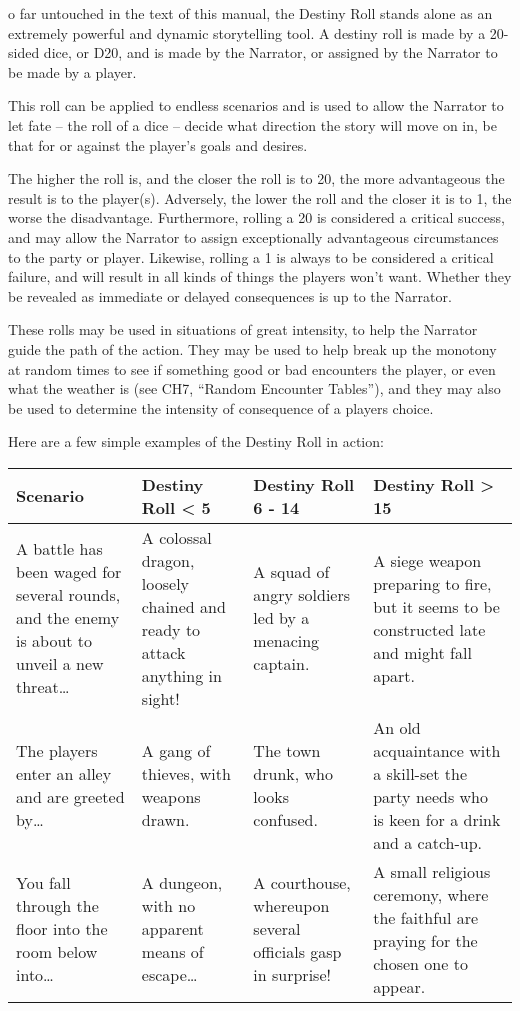 o far untouched in the text of this manual, the Destiny Roll stands alone as an extremely powerful and dynamic storytelling tool. A destiny roll is made by a 20-sided dice, or D20, and is made by the Narrator, or assigned by the Narrator to be made by a player.

This roll can be applied to endless scenarios and is used to allow the Narrator to let fate – the roll of a dice – decide what direction the story will move on in, be that for or against the player's goals and desires.

The higher the roll is, and the closer the roll is to 20, the more advantageous the result is to the player(s). Adversely, the lower the roll and the closer it is to 1, the worse the disadvantage. Furthermore, rolling a 20 is considered a critical success, and may allow the Narrator to assign exceptionally advantageous circumstances to the party or player. Likewise, rolling a 1 is always to be considered a critical failure, and will result in all kinds of things the players won’t want. Whether they be revealed as immediate or delayed consequences is up to the Narrator.

These rolls may be used in situations of great intensity, to help the Narrator guide the path of the action. They may be used to help break up the monotony at random times to see if something good or bad encounters the player, or even what the weather is (see CH7, “Random Encounter Tables”), and they may also be used to determine the intensity of consequence of a players choice.

Here are a few simple examples of the Destiny Roll in action:

\begin{center}
    \begin{tabular}{|p{}|p{} p{} p{}|} 
        \hline 
        \textbf{Scenario} & \textbf{Destiny Roll < 5} & \textbf{Destiny Roll 6 - 14} & \textbf{Destiny Roll > 15} \\ 
        \hline
        A battle has been waged for several rounds, and the enemy is about to unveil a new threat… & 
        A colossal dragon, loosely chained and ready to attack anything in sight! & 
        A squad of angry soldiers led by a menacing captain. & 
        A siege weapon preparing to fire, but it seems to be constructed late and might fall apart. \\
        The players enter an alley and are greeted by… &
        A gang of thieves, with weapons drawn. &
        The town drunk, who looks confused. &
        An old acquaintance with a skill-set the party needs who is keen for a drink and a catch-up. \\
        You fall through the floor into the room below into… &
        A dungeon, with no apparent means of escape… &
        A courthouse, whereupon several officials gasp in surprise! &
        A small religious ceremony, where the faithful are praying for the chosen one to appear. \\
        \hline
    \end{tabular}
\end{center}

